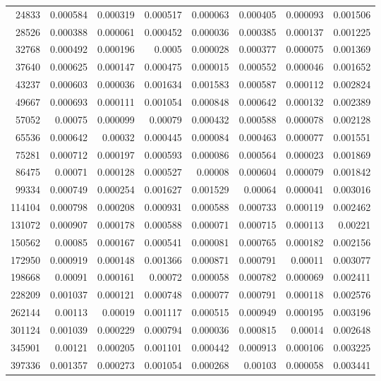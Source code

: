 \begin{longtable}{r r r r r r r r}
24833 & 0.000584 & 0.000319 & 0.000517 & 0.000063 & 0.000405 & 0.000093 & 0.001506 \\
28526 & 0.000388 & 0.000061 & 0.000452 & 0.000036 & 0.000385 & 0.000137 & 0.001225 \\
32768 & 0.000492 & 0.000196 & 0.0005 & 0.000028 & 0.000377 & 0.000075 & 0.001369 \\
37640 & 0.000625 & 0.000147 & 0.000475 & 0.000015 & 0.000552 & 0.000046 & 0.001652 \\
43237 & 0.000603 & 0.000036 & 0.001634 & 0.001583 & 0.000587 & 0.000112 & 0.002824 \\
49667 & 0.000693 & 0.000111 & 0.001054 & 0.000848 & 0.000642 & 0.000132 & 0.002389 \\
57052 & 0.00075 & 0.000099 & 0.00079 & 0.000432 & 0.000588 & 0.000078 & 0.002128 \\
65536 & 0.000642 & 0.00032 & 0.000445 & 0.000084 & 0.000463 & 0.000077 & 0.001551 \\
75281 & 0.000712 & 0.000197 & 0.000593 & 0.000086 & 0.000564 & 0.000023 & 0.001869 \\
86475 & 0.00071 & 0.000128 & 0.000527 & 0.00008 & 0.000604 & 0.000079 & 0.001842 \\
99334 & 0.000749 & 0.000254 & 0.001627 & 0.001529 & 0.00064 & 0.000041 & 0.003016 \\
114104 & 0.000798 & 0.000208 & 0.000931 & 0.000588 & 0.000733 & 0.000119 & 0.002462 \\
131072 & 0.000907 & 0.000178 & 0.000588 & 0.000071 & 0.000715 & 0.000113 & 0.00221 \\
150562 & 0.00085 & 0.000167 & 0.000541 & 0.000081 & 0.000765 & 0.000182 & 0.002156 \\
172950 & 0.000919 & 0.000148 & 0.001366 & 0.000871 & 0.000791 & 0.00011 & 0.003077 \\
198668 & 0.00091 & 0.000161 & 0.00072 & 0.000058 & 0.000782 & 0.000069 & 0.002411 \\
228209 & 0.001037 & 0.000121 & 0.000748 & 0.000077 & 0.000791 & 0.000118 & 0.002576 \\
262144 & 0.00113 & 0.00019 & 0.001117 & 0.000515 & 0.000949 & 0.000195 & 0.003196 \\
301124 & 0.001039 & 0.000229 & 0.000794 & 0.000036 & 0.000815 & 0.00014 & 0.002648 \\
345901 & 0.00121 & 0.000205 & 0.001101 & 0.000442 & 0.000913 & 0.000106 & 0.003225 \\
397336 & 0.001357 & 0.000273 & 0.001054 & 0.000268 & 0.00103 & 0.000058 & 0.003441 \\

\end{longtable}
